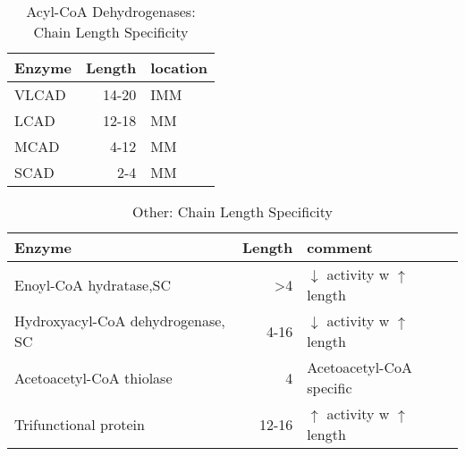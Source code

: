 \documentclass{scrartcl}
\begin{document}
\begin{table}[htbp]
\caption{\label{tab:org241b7f0}
Acyl-CoA Dehydrogenases: Chain Length Specificity}
\centering
\begin{tabular}{lrl}
Enzyme & Length & location\\
\hline
VLCAD & 14-20 & IMM\\
LCAD & 12-18 & MM\\
MCAD & 4-12 & MM\\
SCAD & 2-4 & MM\\
\end{tabular}
\end{table}


\begin{table}[htbp]
\caption{\label{tab:orga0b4a4d}
Other: Chain Length Specificity}
\centering
\begin{tabular}{lrl}
Enzyme & Length & comment\\
\hline
Enoyl-CoA hydratase,SC & >4 & \(\downarrow\) activity w \(\uparrow\) length\\
Hydroxyacyl-CoA dehydrogenase, SC & 4-16 & \(\downarrow\) activity w \(\uparrow\) length\\
Acetoacetyl-CoA thiolase & 4 & Acetoacetyl-CoA specific\\
Trifunctional protein & 12-16 & \(\uparrow\) activity w \(\uparrow\) length\\
\end{tabular}
\end{table}
\end{document}
